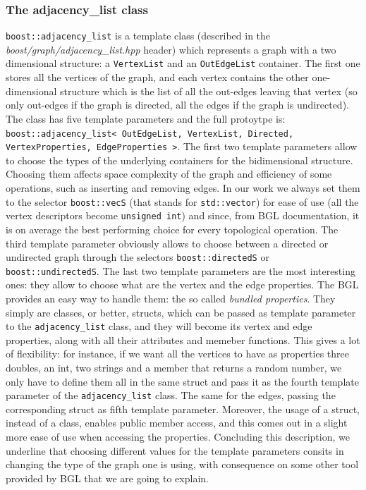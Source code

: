 \documentclass[10pt]{article} %
\newcommand{\classname}[1]{\texttt{#1}}
\begin{document}
	\subsubsection{The adjacency\_list class}
	\classname{boost::adjacency\_list} is a template class (described in the \textit{boost/graph/adjacency\_list.hpp} header) which represents a graph with a two dimensional structure: a \texttt{VertexList} and an \texttt{OutEdgeList} container. The first one stores all the vertices of the graph, and each vertex contains the other one-dimensional structure which is the list of all the out-edges leaving that vertex (so only out-edges if the graph is directed, all the edges if the graph is undirected). \newline
	The class has five template parameters and the full protoytpe is: \classname{boost::adjacency\_list< OutEdgeList, VertexList, Directed, VertexProperties, EdgeProperties >}. \newline
	The first two template parameters allow to choose the types of the underlying containers for the bidimensional structure. Choosing them affects space complexity of the graph and efficiency of some operations, such as inserting and removing edges. In our work we always set them to the selector \classname{boost::vecS} (that stands for \texttt{std::vector}) for ease of use (all the vertex descriptors become \texttt{unsigned int}) and since, from BGL documentation, it is on average the best performing choice for every topological operation. \newline
	The third template parameter obviously allows to choose between a directed or undirected graph through the selectors \texttt{boost::directedS} or \texttt{boost::undirectedS}.\newline
	The last two template parameters are the most interesting ones: they allow to choose what are the vertex and the edge properties. The BGL provides an easy way to handle them: the so called \textit{bundled properties}. They simply are classes, or better, structs, which can be passed as template parameter to the \classname{adjacency\_list} class, and they will become its vertex and edge properties, along with all their attributes and memeber functions. This gives a lot of flexibility: for instance, if we want all the vertices to have as properties three doubles, an int, two strings and a member that returns a random number, we only have to define them all in the same struct and pass it as the fourth template parameter of the \classname{adjacency\_list} class. The same for the edges, passing the corresponding struct as fifth template parameter. Moreover, the usage of a struct, instead of a class, enables public member access, and this comes out in a slight more ease of use when accessing the properties. \newline
	Concluding this description, we underline that choosing different values for the template parameters consits in changing the type of the graph one is using, with consequence on some other tool provided by BGL that we are going to explain.
	
\end{document}
